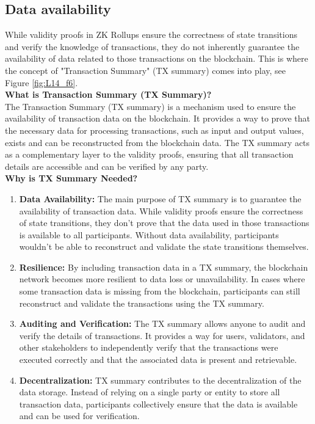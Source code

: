 \subsection{Data availability}
While validity proofs in ZK Rollups ensure the correctness of state transitions and verify the knowledge of transactions, they do not inherently guarantee the availability of data related to those transactions on the blockchain. This is where the concept of "Transaction Summary" (TX summary) comes into play, see Figure \ref{fig:L14_f6}.\\
\textbf{What is Transaction Summary (TX Summary)?}\\
The Transaction Summary (TX summary) is a mechanism used to ensure the availability of transaction data on the blockchain. It provides a way to prove that the necessary data for processing transactions, such as input and output values, exists and can be reconstructed from the blockchain data. The TX summary acts as a complementary layer to the validity proofs, ensuring that all transaction details are accessible and can be verified by any party.\\
\textbf{Why is TX Summary Needed?}
\begin{enumerate}
	\item \textbf{Data Availability:}  The main purpose of TX summary is to guarantee the availability of transaction data. While validity proofs ensure the correctness of state transitions, they don't prove that the data used in those transactions is available to all participants. Without data availability, participants wouldn't be able to reconstruct and validate the state transitions themselves.
	\item \textbf{Resilience:} By including transaction data in a TX summary, the blockchain network becomes more resilient to data loss or unavailability. In cases where some transaction data is missing from the blockchain, participants can still reconstruct and validate the transactions using the TX summary.
	\item \textbf{Auditing and Verification:} The TX summary allows anyone to audit and verify the details of transactions. It provides a way for users, validators, and other stakeholders to independently verify that the transactions were executed correctly and that the associated data is present and retrievable.
	\item \textbf{Decentralization:} TX summary contributes to the decentralization of the data storage. Instead of relying on a single party or entity to store all transaction data, participants collectively ensure that the data is available and can be used for verification.
\end{enumerate}
